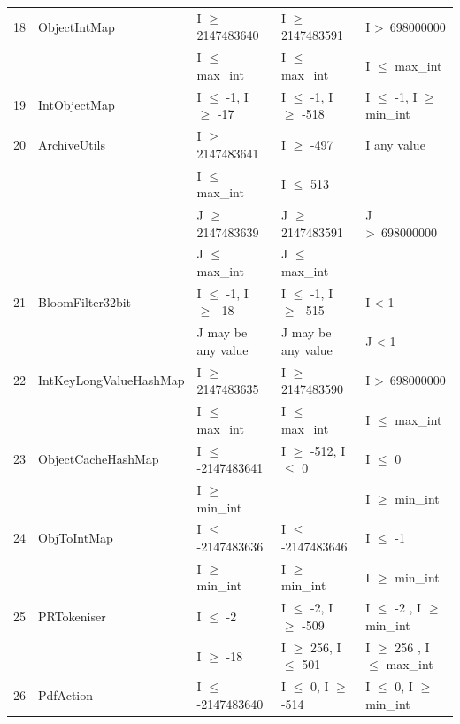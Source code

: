 {\begin{longtable}{|l|l|l|l|l|}
18	& ObjectIntMap				& I $\ge$ 2147483640			& I $\ge$ 2147483591			& I \textgreater~698000000					\\ 
	&                                             & I $\le$ max\_int					& I $\le$ max\_int					& I $\le$ max\_int			\\	
19	& IntObjectMap				& I $\le$ -1, I $\ge$ -17			& I $\le$ -1, I $\ge$ -518			& I $\le$ -1, I $\ge$ min\_int\\ 
20	& ArchiveUtils				& I $\ge$ 2147483641			& I $\ge$ -497					& I any value									\\ 
	&							& I $\le$ max\_int					& I $\le$ 513					& 											\\ 
	&                                             & J $\ge$ 2147483639			& J $\ge$ 2147483591			& J \textgreater~698000000 	   				\\
	&                                             & J $\le$ max\_int					&  J $\le$ max\_int				&  	   										\\
21	& BloomFilter32bit 			& I $\le$ -1, I $\ge$ -18			& I $\le$ -1, I $\ge$ -515			& I \textless -1 								\\ 
	&                                             & J may be any value				& J may be any value				& J \textless -1 			   					\\	
22	& IntKeyLongValueHashMap	& I $\ge$ 2147483635			& I $\ge$ 2147483590			& I \textgreater~698000000					\\ 
	&                                             & I $\le$ max\_int					& I $\le$ max\_int					& I $\le$ max\_int			\\	
23	& ObjectCacheHashMap		& I $\le$ -2147483641			& I $\ge$ -512, I $\le$ 0			& I $\le$ 0								\\ 
	&                                             & I $\ge$ min\_int					& 								& I $\ge$ min\_int				\\	
24	& ObjToIntMap				& I $\le$ -2147483636			& I $\le$ -2147483646			& I $\le$ -1								\\ 
	&                                             & I $\ge$ min\_int					& I $\ge$ min\_int				& I $\ge$ min\_int			   	\\	
25	& PRTokeniser				& I $\le$ -2						& I $\le$ -2, I $\ge$ -509			& I $\le$ -2 , I $\ge$ min\_int\\ 
	&                                             & I $\ge$ -18					& I $\ge$ 256, I $\le$ 501		& I $\ge$ 256 , I $\le$ max\_int\\
26	& PdfAction					& I $\le$ -2147483640 			& I $\le$ 0, I $\ge$ -514			& I $\le$ 0, I $\ge$ min\_int 	\\ 

\end{longtable}}
